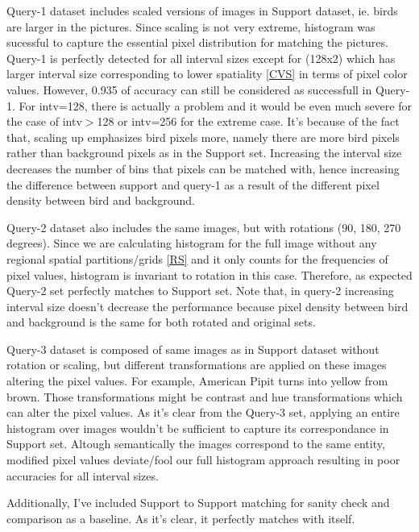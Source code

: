 \documentclass[12pt]{article}
\begin{document}
\vspace{1cm}


Query-1 dataset includes scaled versions of images in Support dataset, 
ie. birds are larger in the pictures.
Since scaling is not very extreme, histogram was sucessful to capture the essential
pixel distribution for matching the pictures. Query-1 is perfectly detected for all interval sizes 
except for (128x2) which has larger interval size corresponding to lower spatiality \ref{CVS}
in terms of pixel color values. However, 0.935 of accuracy can still be considered as successfull in Query-1.
For intv=128, there is actually a problem and it would be even much severe for the case of intv$>$128 or intv=256 for the extreme case.
It's because of the fact that, scaling up emphasizes bird pixels more, namely there are more bird pixels 
rather than background pixels as in the Support set. Increasing the interval size 
decreases the number of bins that pixels can be matched with, hence increasing the difference between
support and query-1 as a result of the different pixel density between bird and background.

Query-2 dataset also includes the same images, but with rotations (90, 180, 270 degrees).
Since we are calculating histogram for the full image without any regional spatial partitions/grids \ref{RS}
and it only counts for the frequencies of pixel values, histogram is invariant to rotation in this case.
Therefore, as expected Query-2 set perfectly matches to Support set.
Note that, in query-2 increasing interval size doesn't decrease the performance because pixel density 
between bird and background is the same for both rotated and original sets.

Query-3 dataset is composed of same images as in Support dataset without rotation or scaling,
but different transformations are applied on these images altering the pixel values. 
For example, American Pipit turns into yellow from brown. Those transformations might 
be contrast and hue transformations which can alter the pixel values. 
As it's clear from the Query-3 set, applying an entire histogram over images wouldn't be sufficient 
to capture its correspondance in Support set. Altough semantically the images correspond to the 
same  entity, modified pixel values deviate/fool our full histogram approach resulting in poor accuracies
for all interval sizes.


Additionally, I've included Support to Support matching for 
sanity check and comparison as a baseline. As it's clear, it perfectly matches with itself.
\end{document}
